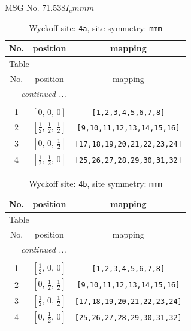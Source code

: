 \documentclass[fleqn,8pt]{jsarticle}
\begin{document}
\setcounter{MaxMatrixCols}{32}

\renewcommand{\tablename}{Table~}
\renewcommand{\figurename}{Figure~}
\begin{center}
\LARGE
MSG No. 71.538\quad$I_{c}mmm$
\end{center}
\renewcommand{\arraystretch}{1.2}
\begin{longtable}{ccc}
\caption{Wyckoff site: {\tt 4a}, site symmetry: {\tt mmm}}
 \\
 \hline \hline
No. & position & mapping \\ \hline \endfirsthead

\multicolumn{2}{l}{\tablename\ \thetable{}} \\
 \hline \hline
No. & position & mapping \\ \hline \endhead

 \hline \hline
\multicolumn{2}{r}{\footnotesize\it continued ...} \\ \endfoot

 \hline \hline
\multicolumn{2}{r}{} \\ \endlastfoot

1 & $\left[ 0,\, 0,\, 0 \right]$ & {\tt [1,2,3,4,5,6,7,8]} \\ \hline
2 & $\left[ \frac{1}{2},\, \frac{1}{2},\, \frac{1}{2} \right]$ & {\tt [9,10,11,12,13,14,15,16]} \\ \hline
3 & $\left[ 0,\, 0,\, \frac{1}{2} \right]$ & {\tt [17,18,19,20,21,22,23,24]} \\ \hline
4 & $\left[ \frac{1}{2},\, \frac{1}{2},\, 0 \right]$ & {\tt [25,26,27,28,29,30,31,32]} \\
\end{longtable}
\renewcommand{\arraystretch}{1.2}
\begin{longtable}{ccc}
\caption{Wyckoff site: {\tt 4b}, site symmetry: {\tt mmm}}
 \\
 \hline \hline
No. & position & mapping \\ \hline \endfirsthead

\multicolumn{2}{l}{\tablename\ \thetable{}} \\
 \hline \hline
No. & position & mapping \\ \hline \endhead

 \hline \hline
\multicolumn{2}{r}{\footnotesize\it continued ...} \\ \endfoot

 \hline \hline
\multicolumn{2}{r}{} \\ \endlastfoot

1 & $\left[ \frac{1}{2},\, 0,\, 0 \right]$ & {\tt [1,2,3,4,5,6,7,8]} \\ \hline
2 & $\left[ 0,\, \frac{1}{2},\, \frac{1}{2} \right]$ & {\tt [9,10,11,12,13,14,15,16]} \\ \hline
3 & $\left[ \frac{1}{2},\, 0,\, \frac{1}{2} \right]$ & {\tt [17,18,19,20,21,22,23,24]} \\ \hline
4 & $\left[ 0,\, \frac{1}{2},\, 0 \right]$ & {\tt [25,26,27,28,29,30,31,32]} \\
\end{longtable}
\end{document}
